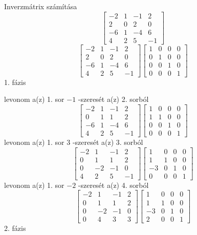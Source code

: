\documentclass[12pt]{article}
\begin{document}
Inverzmátrix számítása
$$\left[{\begin{array}{cccc}-2& 1& -1& 2\\ 2& 0& 2& 0\\ -6& 1& -4& 6\\ 4& 2& 5& -1\end{array}}\right]$$
$$\left[{\begin{array}{cccc}-2& 1& -1& 2\\ 2& 0& 2& 0\\ -6& 1& -4& 6\\ 4& 2& 5& -1\end{array}}\right]\left[{\begin{array}{cccc}1& 0& 0& 0\\ 0& 1& 0& 0\\ 0& 0& 1& 0\\ 0& 0& 0& 1\end{array}}\right]$$
1. fázis

levonom a(z) 1. sor $-1$ -szeresét a(z) 2. sorból
$$\left[{\begin{array}{cccc}-2& 1& -1& 2\\ 0& 1& 1& 2\\ -6& 1& -4& 6\\ 4& 2& 5& -1\end{array}}\right]\left[{\begin{array}{cccc}1& 0& 0& 0\\ 1& 1& 0& 0\\ 0& 0& 1& 0\\ 0& 0& 0& 1\end{array}}\right]$$
levonom a(z) 1. sor $3$ -szeresét a(z) 3. sorból
$$\left[{\begin{array}{cccc}-2& 1& -1& 2\\ 0& 1& 1& 2\\ 0& -2& -1& 0\\ 4& 2& 5& -1\end{array}}\right]\left[{\begin{array}{cccc}1& 0& 0& 0\\ 1& 1& 0& 0\\ -3& 0& 1& 0\\ 0& 0& 0& 1\end{array}}\right]$$
levonom a(z) 1. sor $-2$ -szeresét a(z) 4. sorból
$$\left[{\begin{array}{cccc}-2& 1& -1& 2\\ 0& 1& 1& 2\\ 0& -2& -1& 0\\ 0& 4& 3& 3\end{array}}\right]\left[{\begin{array}{cccc}1& 0& 0& 0\\ 1& 1& 0& 0\\ -3& 0& 1& 0\\ 2& 0& 0& 1\end{array}}\right]$$
2. fázis
\end{document}
